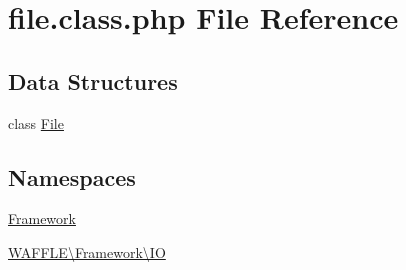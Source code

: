 \hypertarget{file_8class_8php}{}\section{file.\+class.\+php File Reference}
\label{file_8class_8php}
\subsection*{Data Structures}
\begin{DoxyCompactItemize}
\item 
class \hyperlink{class_w_a_f_f_l_e_1_1_framework_1_1_i_o_1_1_file}{File}
\end{DoxyCompactItemize}
\subsection*{Namespaces}
\begin{DoxyCompactItemize}
\item 
 \hyperlink{namespace_framework}{Framework}
\item 
 \hyperlink{namespace_w_a_f_f_l_e_1_1_framework_1_1_i_o}{W\+A\+F\+F\+L\+E\textbackslash{}\+Framework\textbackslash{}\+IO}
\end{DoxyCompactItemize}
